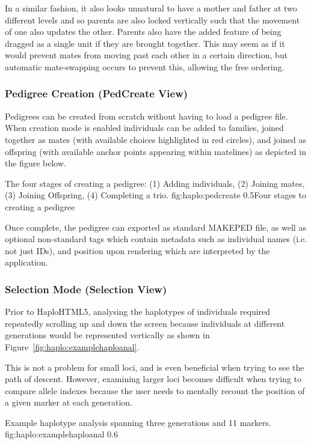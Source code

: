 In a similar fashion, it also looks unnatural to have a mother and father at two different levels and so  parents are also locked vertically such that the movement of one also updates the other. Parents also have the added feature of being dragged as a single unit if they are brought together. This may seem as if it would prevent mates from moving past each other in a certain direction, but automatic mate-swapping occurs to prevent this, allowing the free ordering.

\subsubsection{Pedigree Creation (PedCreate View)}

Pedigrees can be created from scratch without having to load a pedigree file. When creation mode is  enabled individuals can be added to families, joined together as mates (with available choices highlighted in red circles), and joined as offspring (with available anchor points appearing within matelines) as depicted in the figure below.

	{The four stages of creating a pedigree: (1) Adding individuals, (2) Joining mates, (3) Joining Offspring, (4) Completing a trio.}
	{fig:haplo:pedcreate}
	{0.5}{Four stages to creating a pedigree}
	
Once complete, the pedigree can exported as standard MAKEPED file, as well as optional non-standard tags which contain metadata such as individual names (i.e. not just IDs), and position upon rendering which are interpreted by the application.

\subsubsection{Selection Mode (Selection View)}

Prior to HaploHTML5, analysing the haplotypes of individuals required repeatedly scrolling up and down the screen because individuals at different generations would be represented vertically as shown in Figure~\ref{fig:haplo:examplehaploanal}.

This is not a problem for small loci, and is even beneficial when trying to see the path of descent. However, examining larger loci becomes difficult when trying to compare allele indexes because the user needs to mentally recount the position of a given marker at each generation.

	{Example haplotype analysis spanning three generations and 11 markers.}
	{fig:haplo:examplehaploanal}
	{0.6}{}




